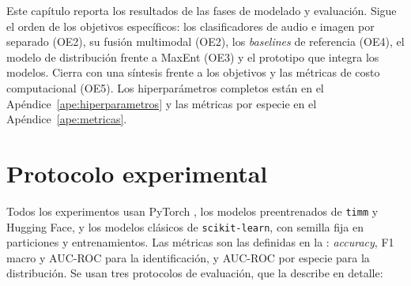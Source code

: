 
Este capítulo reporta los resultados de las fases de modelado y evaluación.
Sigue el orden de los objetivos específicos: los clasificadores de audio e
imagen por separado (OE2), su fusión multimodal (OE2), los \textit{baselines}
de referencia (OE4), el modelo de distribución frente a MaxEnt (OE3) y el
prototipo que integra los modelos. Cierra con una síntesis frente a los
objetivos y las métricas de costo computacional (OE5). Los hiperparámetros
completos están en el Apéndice~\ref{ape:hiperparametros} y las métricas por
especie en el Apéndice~\ref{ape:metricas}.

\section{Protocolo experimental}\label{sec:protocolo}

Todos los experimentos usan PyTorch \citep{paszke2019pytorch}, los modelos
preentrenados de \texttt{timm} y Hugging Face, y los modelos clásicos de
\texttt{scikit-learn}, con semilla fija en particiones y entrenamientos. Las
métricas son las definidas en la :
\textit{accuracy}, F1 macro y AUC-ROC para la identificación, y AUC-ROC por
especie para la distribución. Se usan tres protocolos de evaluación, que la
 describe en detalle:

